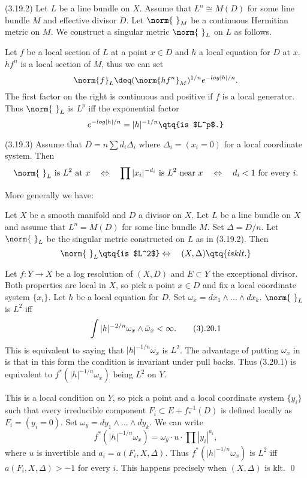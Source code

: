 (3.19.2) Let $L$ be a line bundle on $X$. Assume that $L^n\cong M(D)$ for some
line bundle $M$ and effective divisor $D$.
Let $\norm{\ }_M$ be  a continuous Hermitian metric on $M$. We construct  a
singular metric 
$\norm{\ }_L$ on $L$ as follows. 

Let $f$ be a local section of $L$ at a point $x\in D$ and  $h$  a local
equation for $D$ at $x$.   $hf^n$ is a local section of 
$M$, thus we can set
$$
\norm{f}_L\deq (\norm{hf^n}_M)^{1/n}e^{-log|h|/n}.
$$
The first factor on the right is continuous
and positive if $f$ is a local generator. Thus $\norm{\ }_L$ is $L^p$
iff the exponential factor
$$
e^{-log|h|/n}=|h|^{-1/n}\qtq{is $L^p$.}
$$



(3.19.3) Assume that  $D=n\sum d_i\Delta_i$
where $\Delta_i=(x_i=0)$ for a local coordinate system. Then
$$
\text{$\norm{\ }_L$ is $L^2$ at $x$} \quad\Leftrightarrow\quad
\text{$\prod |x_i|^{-d_i}$ is $L^2$ near $x$} \quad\Leftrightarrow\quad
\text{$d_i<1$ for every $i$.}
$$
\enddemo


More generally 
we have:

  Let $X$ be a smooth manifold
and  $D$  a divisor on $X$. Let $L$ be a line bundle on $X$ and assume
that $L^n=M(D)$ for some line bundle $M$.
Set $\Delta=D/n$. 
 Let $\norm{\ }_L$ be the singular
metric constructed on $L$ as in (3.19.2). Then
$$
\norm{\ }_L \qtq{is $L^2$}\Leftrightarrow\quad (X,\Delta) \qtq{ is klt.}
$$
\endproclaim

\demop Let $f:Y\to X$ be a log resolution of $(X,D)$ and $E\subset Y$ the
exceptional divisor.  Both properties are local in $X$, so pick a point $x\in
D$ and fix a local coordinate system $\{x_i\}$. 
Let $h$ be a local equation for $D$.
Set $\omega_x=dx_1\wedge \dots\wedge dx_k$.   $\norm{\ }_L$ is $L^2$ iff
$$
\int |h|^{-2/n}\omega_x\wedge \bar \omega_x<\infty.\tag 3.20.1
$$
This is equivalent to saying that $|h|^{-1/n}\omega_x$ is $L^2$.
The advantage of putting $\omega_x$ in is that in this form the condition is
invariant under pull backs. Thus (3.20.1) is equivalent to
$f^*(|h|^{-1/n}\omega_x)$ being $L^2$ on $Y$.

This is a local condition on $Y$, so pick a point and  a local coordinate system
$\{y_i\}$ such that every irreducible component $F_i\subset E+f^{-1}_*(D)$ is
defined
 locally  as
$F_i=(y_i=0)$.
 Set $\omega_y=dy_1\wedge \dots\wedge dy_k$.  We can write
$$
f^*(|h|^{-1/n}\omega_x)=\omega_y\cdot u\cdot \prod |y_i|^{a_i},
$$
where $u$ is  invertible and 
$a_i=a(F_i,X,\Delta)$. Thus 
$f^*(|h|^{-1/n}\omega_x)$ is 
$L^2$ iff $a(F_i,X,\Delta)>-1$ for every $i$.
This happens precisely when $(X,\Delta)$ 
is klt.
\qed\enddemo








